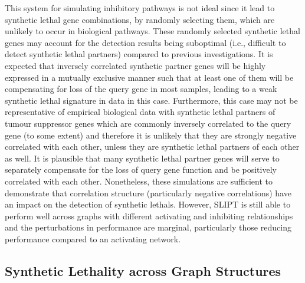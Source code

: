 This system for simulating inhibitory pathways is not ideal since it lead to \gls{synthetic lethal} gene combinations, by randomly selecting them, which are unlikely to occur in biological pathways. These randomly selected \gls{synthetic lethal} genes may account for the detection results being suboptimal (i.e., difficult to detect \gls{synthetic lethal} partners) compared to previous investigations. It is expected that inversely correlated synthetic partner genes will be highly expressed in a mutually exclusive manner such that at least one of them will be compensating for loss of the query gene in most samples, leading to a weak \gls{synthetic lethal} signature in  data in this case. Furthermore, this case may not be representative of empirical biological data with \gls{synthetic lethal} partners of \gls{tumour suppressor} genes which are commonly inversely correlated to the query gene (to some extent) and therefore it is unlikely that they are strongly negative correlated with each other, unless they are \gls{synthetic lethal} partners of each other as well. It is plausible that many \gls{synthetic lethal} partner genes will serve to separately compensate for the loss of query gene function and be positively correlated with each other. Nonetheless, these simulations are sufficient to demonstrate that correlation structure (particularly negative correlations) have an impact on the detection of \glspl{synthetic lethal}. However, \gls{SLIPT} is still able to perform well across \glspl{graph} with different activating and inhibiting relationships and the perturbations in performance are marginal, particularly those reducing performance compared to an activating network.  

\FloatBarrier

\subsection{Synthetic Lethality across Graph Structures}
\label{chapt5:graphsim_str}

\FloatBarrier

